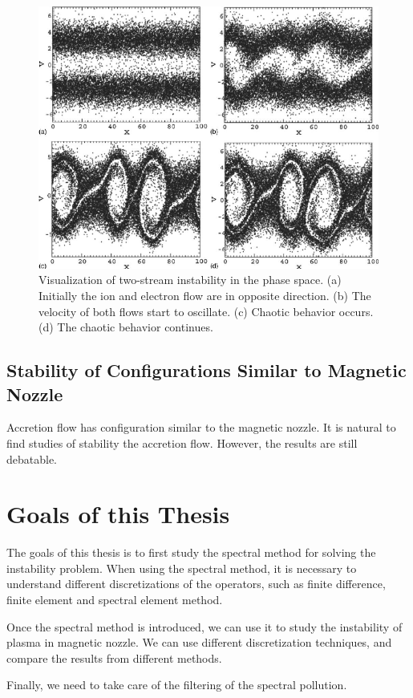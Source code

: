 \begin{figure}[H]
	\centering
	\includegraphics[width=0.7\linewidth]{img/introduction/two_stream_instability}
	\caption{Visualization of two-stream instability in the phase space. (a) Initially the ion and electron flow are in opposite direction. (b) The velocity of both flows start to oscillate. (c) Chaotic behavior occurs. (d) The chaotic behavior continues. \cite{ha_nonlinear_2011}}
	\label{fig:two_stream_instability}
\end{figure}

\subsection{Stability of Configurations Similar to Magnetic Nozzle}
Accretion flow has configuration similar to the magnetic nozzle. It is natural to find studies of stability the accretion flow. However, the results are still debatable. \cite{keto_stability_2020,aikawa_stability_1979,stellingwerf_stability_1978}


\section{Goals of this Thesis}
The goals of this thesis is to first study the spectral method for solving the instability problem. When using the spectral method, it is necessary to understand different discretizations of the operators, such as finite difference, finite element and spectral element method.

Once the spectral method is introduced, we can use it to study the instability of plasma in magnetic nozzle. We can use different discretization techniques, and compare the results from different methods.

Finally, we need to take care of the filtering of the spectral pollution.


